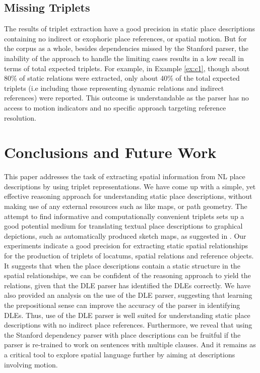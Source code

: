 \documentclass{acm_proc_article-sp}
\begin{document}
\subsection{Missing Triplets}
\label{missing}
The results of triplet extraction have a good precision in static place descriptions containing no indirect or exophoric place references, or spatial motion. But for the corpus as a whole, besides dependencies missed by the Stanford parser, the inability of the approach to handle the limiting cases results in a low recall in terms of total expected triplets. For example, in Example \ref{ex:c1}, though about 80\% of static relations were extracted, only about 40\% of the total expected triplets (i.e including those representing dynamic relations and indirect references) were reported. This outcome is understandable as the parser has no access to motion indicators and no specific approach targeting reference resolution. 

\section{Conclusions and Future Work}
\label{sec:conclusion}
This paper addresses the task of extracting spatial information from NL place descriptions by using triplet representations. We have come up with a simple, yet effective reasoning approach for understanding static place descriptions, without making use of any external resources such as like maps, or path geometry. The attempt to find informative and computationally convenient triplets sets up a good potential medium for translating textual place descriptions to graphical depictions, such as automatically produced sketch maps, as suggested in \cite{maria:descriptions} . Our experiments indicate a good precision for extracting static spatial relationships for the production of triplets of locatums, spatial relations and reference objects. It suggests that when the place descriptions contain a static structure in the spatial relationships, we can be confident of the reasoning approach to yield the relations, given that the DLE parser has identified the DLEs correctly. We have also provided an analysis on the use of the DLE parser, suggesting that learning the prepositional sense can improve the accuracy of the parser in identifying DLEs. Thus, use of the DLE parser is well suited for understanding static place descriptions with no indirect place references. Furthermore, we reveal that using the Stanford dependency parser with place descriptions can be fruitful if the parser is re-trained to work on sentences with multiple clauses. And it remains as a critical tool to explore spatial language further by aiming at descriptions involving motion. 
\end{document}
